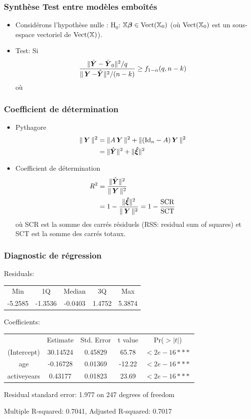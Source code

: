 \begin{frame}
\frametitle{Synthèse Test entre mod\`{e}les emboît\'{e}s}
\begin{itemize}
\item Considérons l'hypothèse  nulle : $\mathrm{H}_0$: $\mathbb{X} \boldsymbol{\beta} \in \mathrm{Vect}(\mathbb{X}_0)$ (où $\mathrm{Vect}(\mathbb{X}_0)$ est un sous-espace vectoriel de $\mathrm{Vect}(\mathbb{X})$).
\item \alert{Test:} Si 
\[
\frac{\|\hat{\boldsymbol{Y}} - \hat{\boldsymbol{Y}}_0\|^2/q}{\|\operatorname{\boldsymbol{Y}} - \hat{\boldsymbol{Y}}\|^2/(n-k)} \geq f_{1-\alpha}(q,n-k) 
\]
où 
\end{itemize}
\end{frame}


\begin{frame}
\frametitle{Coefficient de détermination}
\begin{itemize}
\item \alert{Pythagore}
\begin{align*}
\| \operatorname{\boldsymbol{Y}} \|^2 &= \| A \operatorname{\boldsymbol{Y}} \|^2 + \| (\mathrm{Id}_{n} - A) \operatorname{\boldsymbol{Y}} \|^2 \\
            &= \| \hat{\boldsymbol{Y}} \|^2 + \| \boldsymbol{\hat{\xi}} \|^2
\end{align*}
\item \alert{Coefficient de détermination}
\begin{align*}
R^2 &= \frac{\|\hat{\boldsymbol{Y}}\|^2}{\|\operatorname{\boldsymbol{Y}}\|^2} \\
    &= 1 - \frac{\| \boldsymbol{\hat{\xi}} \|^2}{\|\operatorname{\boldsymbol{Y}}\|^2} = 1 - \frac{\mathrm{SCR}}{\mathrm{SCT}}
\end{align*}
où \alert{SCR} est la somme des carrés résiduels (RSS: residual sum of squares) et \alert{SCT} est la somme des carrés totaux.
\end{itemize}
\end{frame}

\begin{frame}
\frametitle{Diagnostic de régression}

Residuals:
\begin{tabular}{ccccc}
    Min   &   1Q     & Median  &    3Q  &   Max \\
-5.2585   &  -1.3536 & -0.0403 & 1.4752 &  5.3874 \\
\end{tabular}

Coefficients:
\begin{tabular}{ccccc}
                 & Estimate &Std. Error &t value& Pr($>|t|$) \\
(Intercept)      & 30.14524 &   0.45829 &  65.78&   $<2e-16 ***$ \\
age              &-0.16728  &  0.01369  &-12.22 &   $<2e-16 ***$ \\
activeyears      &0.43177   & 0.01823   &23.69  &   $<2e-16 ***$  \\
\end{tabular}

Residual standard error: 1.977 on 247 degrees of freedom

Multiple R-squared:  0.7041,	Adjusted R-squared:  0.7017

\end{frame}




